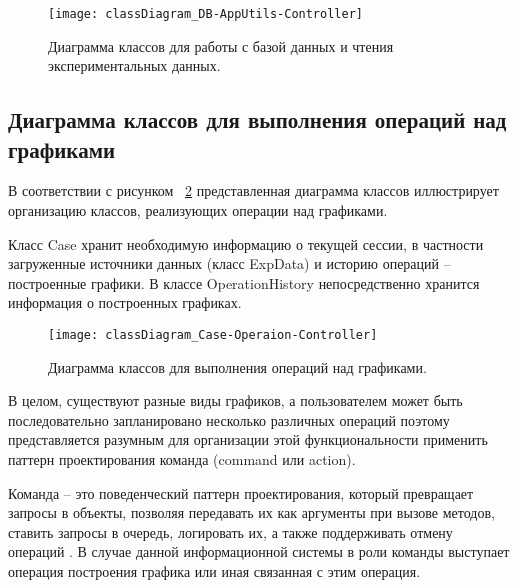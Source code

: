 \documentclass[14pt]{extreport}
\begin{document}
\begin{figure}[H]
\centerline{\texttt{[image: classDiagram\_DB-AppUtils-Controller]}}
\caption{Диаграмма классов для работы с базой данных и чтения экспериментальных данных.}
\label{fig7}
\end{figure}

\subsection{Диаграмма классов для выполнения операций над графиками}
В соответствии с рисунком ~\ref{fig8} представленная диаграмма классов иллюстрирует организацию классов, реализующих операции над графиками.

Класс Case хранит необходимую информацию о текущей сессии, в частности загруженные источники данных (класс ExpData) и историю операций -- построенные графики. В классе OperationHistory непосредственно хранится информация о построенных графиках. 

\begin{figure}[H]
\centerline{\texttt{[image: classDiagram\_Case-Operaion-Controller]}}
\caption{Диаграмма классов для выполнения операций над графиками.}
\label{fig8}
\end{figure}

В целом, существуют разные виды графиков, а пользователем может быть последовательно запланировано несколько различных операций поэтому представляется разумным для организации этой функциональности применить паттерн проектирования команда (command или action).

Команда -- это поведенческий паттерн проектирования, который превращает запросы в объекты, позволяя передавать их как аргументы при вызове методов, ставить запросы в очередь, логировать их, а также поддерживать отмену операций \cite{pattern}. В случае данной информационной системы в роли команды выступает операция построения графика или иная связанная с этим операция.
\end{document}
